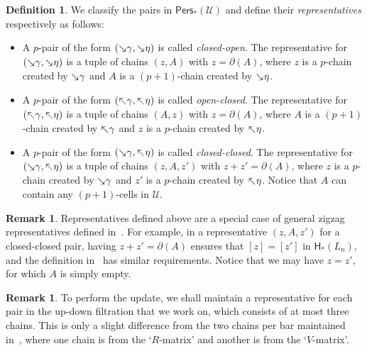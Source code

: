 \documentclass[letterpaper,11pt]{article}
\theoremstyle{mythmstyle}
\theoremstyle{mydefstyle}
\newtheorem{definition}{Definition}
\newtheorem{remark}{Remark}
\theoremstyle{plain}
\theoremstyle{definition}
\newtheorem{definition}[theorem]{Definition}
\newtheorem{remark}[theorem]{Remark}
\newcommand{\Hm}{\mathsf{H}}
\newcommand{\Pers}{\mathsf{Pers}}
\newcommand{\<}[1]{\langle #1\rangle}
\newcommand{\add}[1]{\mskip-2.5mu\rotatebox[origin=c]{-45}{${\rightarrow}$}{#1}}
\newcommand{\del}[1]{\mskip-2.5mu\rotatebox[origin=c]{-45}{${\leftarrow}$}{#1}}
\newcommand{\Ucal}{\mathcal{U}}
\newcommand{\Dim}{p}
\newcommand{\simpcnt}{n}
\newcommand{\ucplx}{L}
\let\defemph\emph
\begin{document}
\begin{definition}\label{dfn:ud-rep}
We classify
the pairs in $\Pers_*(\Ucal)$
and define their \defemph{representatives} respectively as follows:
\begin{itemize}
    \item A $\Dim$-pair of the form $(\add{\gamma},\add{\eta})$ is called \defemph{closed-open}.
    The representative for $(\add{\gamma},\add{\eta})$
    is a tuple of chains $(z,A)$ with $z=\partial(A)$,
    where $z$ is a $\Dim$-chain 
    created by $\add{\gamma}$
    and $A$ is a $(\Dim+1)$-chain
    created by $\add{\eta}$.

    \item A $\Dim$-pair of the form $(\del{\gamma},\del{\eta})$ is called \defemph{open-closed}.
    The representative for $(\del{\gamma},\del{\eta})$
    is a tuple of chains $(A,z)$  with $z=\partial(A)$,
    where $A$ is a $(\Dim+1)$-chain
    created by $\del{\gamma}$
    and $z$ is a $\Dim$-chain 
    created by $\del{\eta}$.

    \item A $\Dim$-pair of the form $(\add{\gamma},\del{\eta})$ is called \defemph{closed-closed}.
    The representative for $(\add{\gamma},\del{\eta})$
    is a tuple of chains $(z,A,z')$ with $z+z'=\partial(A)$,
    where $z$ is a $\Dim$-chain 
    created by $\add{\gamma}$
    and $z'$ is a $\Dim$-chain
    created by $\del{\eta}$.
    Notice that $A$ can contain any $(\Dim+1)$-cells in $\Ucal$.
\end{itemize}
\end{definition}
\begin{remark}
Representatives defined above
are a special case of general zigzag representatives
defined in~\cite{maria2014zigzag}.
For example, in 
a representative $(z,A,z')$ for a closed-closed pair,
having $z+z'=\partial(A)$  ensures 
that 
$[z]=[z']$
in $\Hm_*(\ucplx_{\simpcnt})$,
and the definition in~\cite{maria2014zigzag}
has similar requirements.
Notice that
we may have $z=z'$,
for which  $A$ is simply empty.
\end{remark}

\begin{remark}\label{rmk:constant-bars}
To perform the update, we shall maintain
a representative for each pair in the up-down filtration 
that we work on,
which consists of at most three chains.
This is only a slight difference from the two chains per bar
maintained in~\cite{cohen2006vines},
where one chain is from the `$R$-matrix' and
another is from the `$V$-matrix'.
\end{remark}
\end{document}
